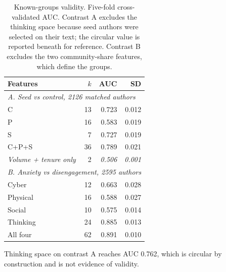 \begin{table}[!t]
\caption{Known-groups validity. Five-fold cross-validated AUC. Contrast A
excludes the thinking space because seed authors were selected on their text;
the circular value is reported beneath for reference. Contrast B excludes the
two community-share features, which define the groups.}
\label{tab:knowngroups}
\centering
\begin{tabular}{lrrr}
\toprule
Features & $k$ & AUC & SD \\
\midrule
\multicolumn{4}{l}{\textit{A. Seed vs control, 2126 matched authors}} \\
C & 13 & 0.723 & 0.012 \\
P & 16 & 0.583 & 0.019 \\
S & 7 & 0.727 & 0.019 \\
C+P+S & 36 & 0.789 & 0.021 \\
\textit{Volume + tenure only} & 2 & \textit{0.506} & \textit{0.001} \\
\midrule
\multicolumn{4}{l}{\textit{B. Anxiety vs disengagement, 2595 authors}} \\
Cyber & 12 & 0.663 & 0.028 \\
Physical & 16 & 0.588 & 0.027 \\
Social & 10 & 0.575 & 0.014 \\
Thinking & 24 & 0.885 & 0.013 \\
All four & 62 & 0.891 & 0.010 \\
\bottomrule
\end{tabular}

\vspace{1mm}
\footnotesize
Thinking space on contrast A reaches AUC 0.762, which is circular by
construction and is not evidence of validity.
\end{table}
